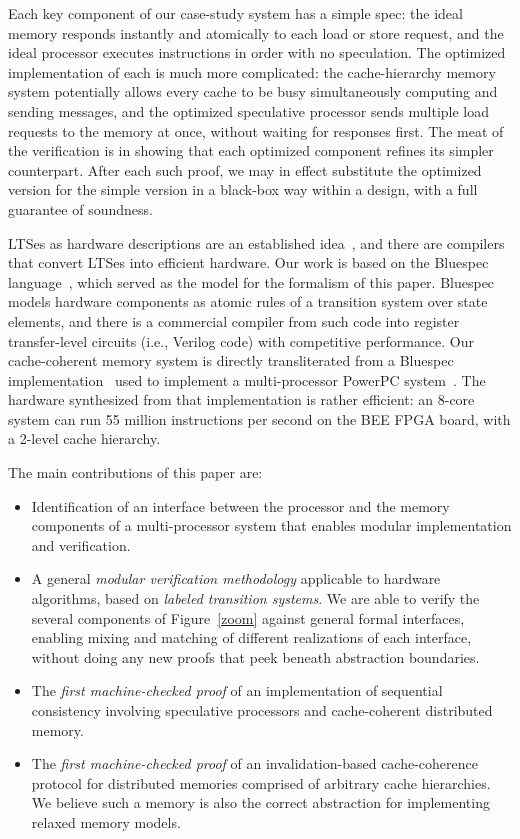 Each key component of our case-study system has a simple spec: the
ideal memory responds instantly and atomically to each load or store
request, and the ideal processor executes instructions in order with
no speculation.  The optimized implementation of each is much more
complicated: the cache-hierarchy memory system potentially allows
every cache to be busy simultaneously computing and sending messages,
and the optimized speculative processor sends multiple load requests
to the memory at once, without waiting for responses first.  The meat
of the verification is in showing that each optimized component
refines its simpler counterpart.  After each such proof, we may in
effect substitute the optimized version for the simple version in a
black-box way within a design, with a full guarantee of soundness.

LTSes as hardware descriptions are an established
idea~\cite{HoeArvind:TRSSynthesis1, Hoe:TCAD}, and there are
compilers that convert LTSes into efficient hardware.  Our work is
based on the Bluespec language~\cite{BSV:LangRef, Bluespec:TFRG},
which served as the model for the formalism of this paper.  Bluespec
models hardware components as atomic rules of a transition system over
state elements, and there is a commercial compiler from such code into
register transfer-level circuits (i.e., Verilog code) with competitive
performance.  Our cache-coherent memory system is directly
transliterated from a Bluespec
implementation~\cite{DNA:CoherenceImplementation} used to
implement a multi-processor PowerPC system~\cite{Khan:PowerPc}. The
hardware synthesized from that implementation is rather efficient:
an 8-core system can run 55 million instructions per second on
the BEE FPGA board\cite{}, with a 2-level cache hierarchy.

The main contributions of this paper are:

\begin{itemize} 
\item Identification of an interface between the processor and the memory
components of a multi-processor system that enables modular implementation and
verification.

\item A general \emph{modular verification methodology} applicable to hardware
  algorithms, based on \emph{labeled transition systems}.  We are able to verify
  the several components of Figure~\ref{zoom}  against general formal interfaces,
  enabling mixing and matching of different realizations of each interface,
  without doing any new proofs that peek beneath abstraction boundaries.

\item The \emph{first machine-checked proof} of an implementation of sequential
  consistency involving speculative processors and cache-coherent distributed
  memory.

\item The \emph{first machine-checked proof} of an invalidation-based
  cache-coherence protocol for distributed memories comprised of arbitrary
  cache hierarchies. We believe such a memory is also the correct abstraction for
  implementing relaxed memory models.
\end{itemize}

